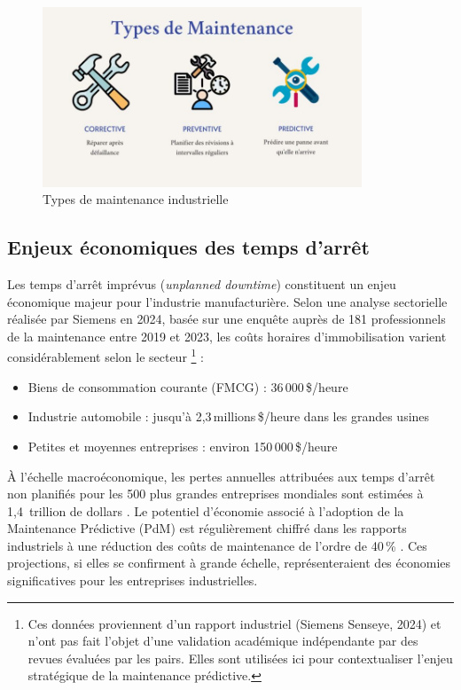 \begin{figure}[ht]
\centering
\includegraphics[width=0.85\textwidth]{images/types-de-maintenance.jpg}
\caption{Types de maintenance industrielle}
\label{fig:maintenance_evolution}
\end{figure}

\subsection{Enjeux économiques des temps d'arrêt}

Les temps d'arrêt imprévus (\textit{unplanned downtime}) constituent un enjeu économique majeur pour l'industrie manufacturière. Selon une analyse sectorielle réalisée par Siemens en 2024, basée sur une enquête auprès de 181 professionnels de la maintenance entre 2019 et 2023, les coûts horaires d'immobilisation varient considérablement selon le secteur \cite{siemens2024}\footnote{Ces données proviennent d'un rapport industriel (Siemens Senseye, 2024) et n'ont pas fait l'objet d'une validation académique indépendante par des revues évaluées par les pairs. Elles sont utilisées ici pour contextualiser l'enjeu stratégique de la maintenance prédictive.} :

\begin{itemize}
\item Biens de consommation courante (FMCG) : 36\,000\,\$/heure
\item Industrie automobile : jusqu'à 2,3\,millions\,\$/heure dans les grandes usines
\item Petites et moyennes entreprises : environ 150\,000\,\$/heure
\end{itemize}

À l'échelle macroéconomique, les pertes annuelles attribuées aux temps d'arrêt non planifiés pour les 500 plus grandes entreprises mondiales sont estimées à 1,4~trillion de dollars \cite{siemens2024}. Le potentiel d'économie associé à l'adoption de la Maintenance Prédictive (PdM) est régulièrement chiffré dans les rapports industriels à une réduction des coûts de maintenance de l'ordre de 40\,\% \cite{siemens2024}. Ces projections, si elles se confirment à grande échelle, représenteraient des économies significatives pour les entreprises industrielles.

